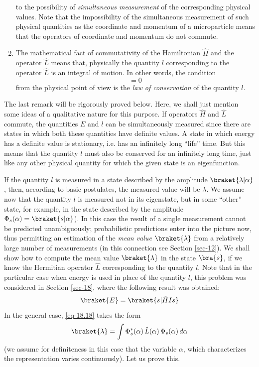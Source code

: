\documentclass[a4paper,sfsidenotes,colorlinks=true]{tufte-book}
\numberwithin{equation}{section}
\numberwithin{figure}{section}
\begin{document}
\begin{enumerate}[label=(\arabic*), leftmargin=1cm]
  to the possibility of \emph{simultaneous measurement} of the corresponding
  physical values. Note that the impossibility of the simultaneous
  measurement of such physical quantities as the coordinate and
  momentum of a microparticle means that the operators of coordinate
  and momentum do not commute.
\item The mathematical fact of commutativity of the Hamiltonian $\hat{H}$
  and the operator $\hat{L}$ means that, physically the quantity $l$
  corresponding to the operator $\hat{L}$ is an integral of motion. In other
  words, the condition 
  \begin{equation*}%
    [ \hat{H}, \, \hat{L}] = 0
  \end{equation*}
  from the physical point of view is the \emph{law of conservation} of the
  quantity $l$.
\end{enumerate}

The last remark will be rigorously proved below. Here, we shall just
mention some ideas of a qualitative nature for this purpose. If
operators $\hat{H}$ and $\hat{L}$ commute, the quantities $E$ and $l$ can be
simultaneously measured since there are states in which both these
quantities have definite values. A state in which energy has a
definite value is stationary, i.e. has an infinitely long ``life''
time. But this means that the quantity $l$ must also be conserved for an
infinitely long time, just like any other physical quantity for which
the given state is an eigenfunction.

If the quantity $l$ is measured
in a state described by the amplitude $\braket{\lambda|\alpha}$, then,
according to basic postulates, the measured value will be
$\lambda$. We assume now that the quantity $l$ is measured not in its
eigenstate, but in some ``other'' state, for example, in the state
described by the amplitude $\Phi_{s} (\alpha) = \braket{s|
  \alpha}$). In this case the result of a single measurement cannot be
predicted unambiguously; probabilistic predictions enter into the
picture now, thus permitting an estimation of the \emph{mean value}
$\braket{\lambda}$ from a relatively large number of measurements (in
this connection see Section \ref{sec-12}). We shall show how to
compute the mean value $\braket{\lambda}$ in the state $\bra{s}$, if we know the Hermitian operator $\hat{L}$ corresponding to the quantity $l$, Note that in the
particular case when energy is used in place of the quantity $l$, this
problem was considered in Section \ref{sec-18}, where the following result was
obtained:
\begin{equation}%
\braket{E} = \braket{s| \hat{H} Is} 
\label{eq-18.18} 
\end{equation}
In the general case, \ref{eq-18.18} takes the form 
\begin{equation}%
\braket{\lambda} = \int \Phi^{*}_{s} (\alpha) \, \hat{L}(\alpha) \,
\Phi_{s} (\alpha) \, d \alpha
\label{eq-18.19} 
\end{equation}
(we assume for definiteness in this case that the variable $\alpha$,
which characterizes the representation varies continuously). Let us
prove this.
\end{document}
